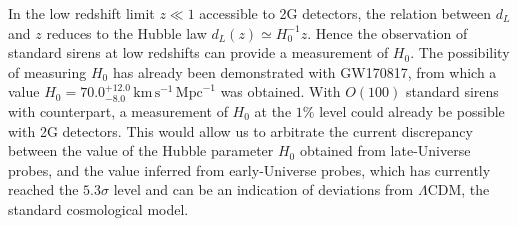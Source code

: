 In the low redshift  limit $z\ll  1$ accessible to 2G detectors, the relation between $d_L$ and $z$ reduces to the Hubble law $d_{L}(z)\simeq H^{-1}_0z$. Hence the observation of standard sirens  at low redshifts can provide  a measurement of  $H_0$. The possibility of measuring $H_0$  has already been demonstrated with  GW170817, from which a value  $H_0=70.0^{+12.0}_{-8.0}\,\mathrm{km}\, \mathrm{s}^{-1}\, \mathrm{Mpc}^{-1}$ was obtained.%
With $O(100)$ standard sirens with counterpart, a measurement of $H_0$ at the $1\%$ level could already be possible with 2G detectors. This would  allow us to  arbitrate the current discrepancy between the  value of the Hubble parameter $H_0$ obtained from  late-Universe probes,
and the  value  inferred from early-Universe probes,
which has currently reached the  $5.3\sigma$ level and can be an indication of deviations from $\Lambda$CDM, the standard cosmological model.




